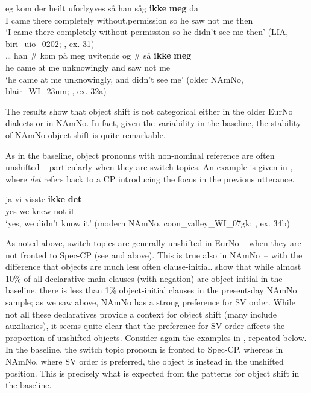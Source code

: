 \documentclass[output=paper]{langscibook}
\begin{document}
\ea \label{ex:larsson:23}
\ea 
\gll eg kom der heilt uforløyves så han såg   \textbf{{ikke}}  \textbf{{meg}}  da\\
     I came there completely without.permission so he saw not me then\\
\glt ‘I came there completely without permission so he didn’t see me then’ (LIA, biri\_uio\_0202; \citealt{LarssonForthcoming}, ex. 31)\label{ex:larsson:23a}\\
\ex  
\gll … han \#   kom på meg   uvitende og \#   så   \textbf{ikke} \textbf{meg}\\
     {} he {} came at me unknowingly and {}  saw   not   me\\
\glt ‘he came at me unknowingly, and didn’t see me’ (older NAmNo, blair\_WI\_23um; \citealt{LarssonForthcoming}, ex. 32a)\label{ex:larsson:23b}\\
\z
\z

The results show that object shift is not categorical either in the older EurNo dialects or in NAmNo. In fact, given the variability in the baseline, the stability of NAmNo object shift is quite remarkable. 

As in the baseline, object pronouns with non-nominal reference are often unshifted – particularly when they are switch topics. An example is given in , where \textit{det} refers back to a CP introducing the focus in the previous utterance. 

\ea%
    \label{ex:larsson:24} 
    \gll ja vi   visste   \textbf{{ikke}}  \textbf{{det}} \\
         yes   we knew   not   it \\
    \glt ‘yes, we didn’t know it’ (modern NAmNo, coon\_valley\_WI\_07gk; \citealt{LarssonForthcoming}, ex. 34b)\\
\z %

As noted above, switch topics are generally unshifted in EurNo – when they are not fronted to Spec-CP (see  and  above). This is true also in NAmNo~– with the difference that objects are much less often clause\hyp initial. \citet{LarssonForthcoming} show that while almost 10\% of all declarative main clauses (with negation) are object-initial in the baseline, there is less than 1\% object-initial clauses in the present-day NAmNo sample; as we saw above, NAmNo has a strong preference for SV order. While not all these declaratives provide a context for object shift (many include auxiliaries), it seems quite clear that the preference for SV order affects the proportion of unshifted objects. Consider again the examples in , repeated below. In the baseline, the switch topic pronoun is fronted to Spec-CP, whereas in NAmNo, where SV order is preferred, the object is instead in the unshifted position. This is precisely what is expected from the patterns for object shift in the baseline. 
\end{document}
